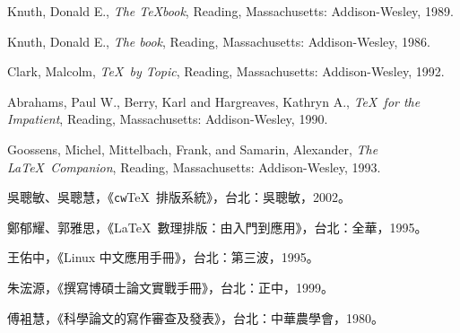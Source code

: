 
\cleardoublepage

\begin{thebibliography}{KDE}
  \label{bib:bib}

   Knuth, Donald E., \textit{The \TeX{}book},
  Reading, Massachusetts: Addison-Wesley, 1989.

   Knuth, Donald E., \textit{The \MF{}book},
  Reading, Massachusetts: Addison-Wesley, 1986.

   Clark, Malcolm, \textit{\TeX\ by Topic},
  Reading, Massachusetts: Addison-Wesley, 1992.

   Abrahams, Paul W., Berry, Karl and Hargreaves, Kathryn A.,
  \textit{\TeX\ for the Impatient},
  Reading, Massachusetts: Addison-Wesley, 1990.

   Goossens, Michel, Mittelbach, Frank, and Samarin, Alexander,
  \textit{The \LaTeX\ Companion},
  Reading, Massachusetts: Addison-Wesley, 1993.

   吳聰敏、吳聰慧，《\texttt{cw}\TeX\ 排版系統》，台北：吳聰敏，2002。

   鄭郁耀、郭雅思，《\LaTeX\ 數理排版：由入門到應用》，台北：全華，1995。

   王佑中，《Linux 中文應用手冊》，台北：第三波，1995。

   朱浤源，《撰寫博碩士論文實戰手冊》，台北：正中，1999。

   傅袓慧，《科學論文的寫作審查及發表》，台北：中華農學會，1980。

\end{thebibliography}

\cleardoublepage